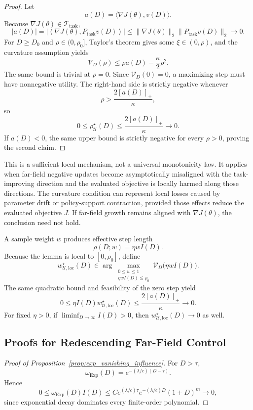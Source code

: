 \documentclass{article}
\theoremstyle{plain}
\theoremstyle{definition}
\theoremstyle{remark}
\begin{document}
\begin{proof}
Let
\[
a(D)
=
\langle\nabla J(\theta),v(D)\rangle.
\]
Because
\(\nabla J(\theta)\in\mathcal T_{\mathrm{task}}\),
\[
|a(D)|
=
\left|
\left\langle
\nabla J(\theta),
P_{\mathrm{task}}v(D)
\right\rangle
\right|
\le
\|\nabla J(\theta)\|_2
\|P_{\mathrm{task}}v(D)\|_2
\longrightarrow0.
\]
For \(D\ge D_0\) and \(\rho\in(0,\rho_0]\), Taylor's theorem gives some
\(\xi\in(0,\rho)\), and the curvature assumption yields
\[
\mathcal V_D(\rho)
\le
\rho a(D)-\frac{\kappa}{2}\rho^2.
\]
The same bound is trivial at \(\rho=0\). Since
\(\mathcal V_D(0)=0\), a maximizing step must have nonnegative utility.
The right-hand side is strictly negative whenever
\[
\rho
>
\frac{2[a(D)]_+}{\kappa},
\]
so
\[
0
\le
\rho_{\mathcal U}^\star(D)
\le
\frac{2[a(D)]_+}{\kappa}
\longrightarrow0.
\]
If \(a(D)<0\), the same upper bound is strictly negative for every
\(\rho>0\), proving the second claim.
\end{proof}

This is a sufficient local mechanism, not a universal monotonicity law.
It applies when far-field negative updates become asymptotically
misaligned with the task-improving direction and the evaluated objective
is locally harmed along those directions. The curvature condition can
represent local losses caused by parameter drift or policy-support
contraction, provided those effects reduce the evaluated objective
\(J\). If far-field growth remains aligned with \(\nabla J(\theta)\),
the conclusion need not hold.

A sample weight \(w\) produces effective step length
\[
\rho(D;w)
=
\eta w I(D).
\]
Because the lemma is local to \([0,\rho_0]\), define
\[
w_{\mathcal U,\mathrm{loc}}^\star(D)
\in
\arg\max_{\substack{0\le w\le1\\ \eta wI(D)\le\rho_0}}
\mathcal V_D\bigl(\eta wI(D)\bigr).
\]
The same quadratic bound and feasibility of the zero step yield
\[
0
\le
\eta I(D)w_{\mathcal U,\mathrm{loc}}^\star(D)
\le
\frac{2[a(D)]_+}{\kappa}
\longrightarrow0.
\]
For fixed \(\eta>0\), if
\(\liminf_{D\to\infty}I(D)>0\), then
\(w_{\mathcal U,\mathrm{loc}}^\star(D)\to0\) as well.

\subsection{Proofs for Redescending Far-Field Control}
\label{app:exp_vanishing_influence}

\begin{proof}[Proof of Proposition~\ref{prop:exp_vanishing_influence}]
For \(D>\tau\),
\[
    \omega_{\mathrm{Exp}}(D)
    =
    e^{-(\lambda/c)(D-\tau)}.
\]
Hence
\[
0\leq
\omega_{\mathrm{Exp}}(D)I(D)
\leq
C e^{(\lambda/c)\tau}
e^{-(\lambda/c)D}(1+D)^m
\longrightarrow0,
\]
since exponential decay dominates every finite-order polynomial.
\end{proof}
\end{document}
